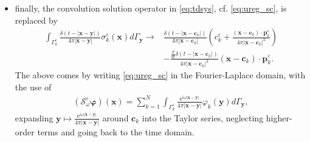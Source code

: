 \documentclass[]{article}
\numberwithin{equation}{section}
\numberwithin{theorem}{section}
\numberwithin{lemma}{section}
\numberwithin{corollary}{section}
\numberwithin{proposition}{section}
\numberwithin{definition}{section}
\newcommand{\bx}{\boldsymbol{x}}
\newcommand{\by}{\boldsymbol{y}}
\newcommand{\re}{\varepsilon}
\renewcommand{\vec}{\boldsymbol}
\begin{document}
\begin{itemize}[leftmargin=*]
		\item finally, the convolution solution operator in \eqref{eq:tdsys}, cf. \eqref{eq:ureg_sc}, is replaced by
		\begin{align*}	\int_{\Gamma_k^{\re}}\frac{\delta(t-|\vec{x}-\vec{y}|)}{4\pi|\vec{x}-\vec{y}|}\sigma^{\re}_k(\vec{x})d\Gamma_{\vec{y}}\rightarrow &\frac{\delta(t-|\vec{x}-\vec{c}_k|)}{4\pi|\vec{x}-\vec{c}_k|}\left(c_k^{\re}+\frac{(\vec{x}-\vec{c}_k)\cdot\vec{p}_k^{\re}}{4\pi|\vec{x}-\vec{c}_k|^3}\right) \\
			&-\frac{\frac{d}{dt} \delta(t-|\vec{x}-\vec{c}_k|)}{4\pi|\vec{x}-\vec{c}_k|^2}(\vec{x}-\vec{c}_k)\cdot \vec{p}_k^{\re}.
		\end{align*}
		The above comes by writing \eqref{eq:ureg_sc} in the Fourier-Laplace domain, with the use of
		\begin{align*}%
			(\mathcal{S}^{\re}_{\omega}\vec{\varphi})(\vec{x})=\sum\limits_{k=1}^N\int_{\Gamma^{\re}_k}\frac{\mathrm{e}^{i\omega|\bx-\by|}}{4\pi|\bx-\by|}\varphi_k(\vec{y})d\Gamma_{\vec{y}},
		\end{align*}
		expanding $\vec{y}\mapsto \frac{\mathrm{e}^{i\omega|\bx-\by|}}{4\pi|\bx-\by|}$ around $\vec{c}_k$ into the Taylor series, neglecting higher-order terms and going back to the time domain. 
	\end{itemize}
	
\end{document}
